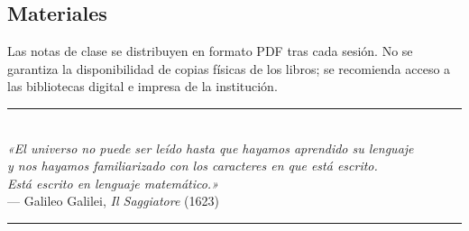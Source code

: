 \documentclass[11pt, letterpaper]{article}
\begin{document}
\subsection{Materiales}
Las notas de clase se distribuyen en formato PDF tras cada sesión. No se garantiza la disponibilidad de copias físicas de los libros; se recomienda acceso a las bibliotecas digital e impresa de la institución.

\vspace{1.5cm}

\begin{center}
\textcolor{mitred}{\rule{0.5\linewidth}{0.6pt}}\\[0.3em]
{\small\textit{«El universo no puede ser leído hasta que hayamos aprendido su lenguaje\\
y nos hayamos familiarizado con los caracteres en que está escrito.\\
Está escrito en lenguaje matemático.»}}\\[0.3em]
{\footnotesize — Galileo Galilei, \textit{Il Saggiatore} (1623)}\\
\textcolor{mitred}{\rule{0.5\linewidth}{0.6pt}}
\end{center}
\end{document}

